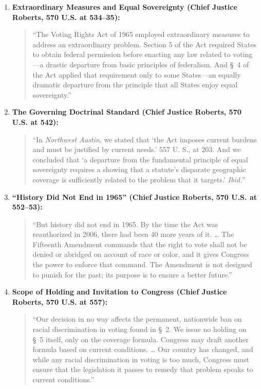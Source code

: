 \documentclass[12pt]{article}
\begin{document}
\begin{enumerate}
    \item \textbf{Extraordinary Measures and Equal Sovereignty (Chief Justice Roberts, 570 U.S. at 534--35):}
    \begin{quote}
    ``The Voting Rights Act of 1965 employed extraordinary measures to address an extraordinary problem. Section 5 of the Act required States to obtain federal permission before enacting any law related to voting---a drastic departure from basic principles of federalism. And \S~4 of the Act applied that requirement only to some States---an equally dramatic departure from the principle that all States enjoy equal sovereignty.''
    \end{quote}

    \item \textbf{The Governing Doctrinal Standard (Chief Justice Roberts, 570 U.S. at 542):}
    \begin{quote}
    ``In \emph{Northwest Austin}, we stated that `the Act imposes current burdens and must be justified by current needs.' 557 U. S., at 203. And we concluded that `a departure from the fundamental principle of equal sovereignty requires a showing that a statute's disparate geographic coverage is sufficiently related to the problem that it targets.' \emph{Ibid.}''
    \end{quote}

    \item \textbf{``History Did Not End in 1965'' (Chief Justice Roberts, 570 U.S. at 552--53):}
    \begin{quote}
    ``But history did not end in 1965. By the time the Act was reauthorized in 2006, there had been 40 more years of it. \ldots{} The Fifteenth Amendment commands that the right to vote shall not be denied or abridged on account of race or color, and it gives Congress the power to enforce that command. The Amendment is not designed to punish for the past; its purpose is to ensure a better future.''
    \end{quote}

    \item \textbf{Scope of Holding and Invitation to Congress (Chief Justice Roberts, 570 U.S. at 557):}
    \begin{quote}
    ``Our decision in no way affects the permanent, nationwide ban on racial discrimination in voting found in \S~2. We issue no holding on \S~5 itself, only on the coverage formula. Congress may draft another formula based on current conditions. \ldots{} Our country has changed, and while any racial discrimination in voting is too much, Congress must ensure that the legislation it passes to remedy that problem speaks to current conditions.''
    \end{quote}


\end{enumerate}
\end{document}
